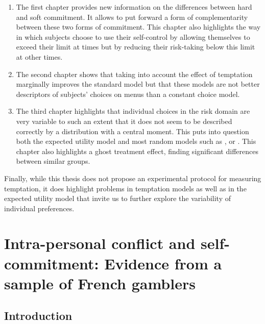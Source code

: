 \documentclass[
]{book}
\providecommand{\tightlist}{%
  \setlength{\itemsep}{0pt}\setlength{\parskip}{0pt}}
\begin{document}
\begin{enumerate}
\def\labelenumi{\arabic{enumi}.}
\tightlist
\item
  The first chapter provides new information on the differences between hard
  and soft commitment.
  It allows to put forward a form of complementarity between these two forms of
  commitment.
  This chapter also highlights the way in which subjects choose to use their
  self-control by allowing themselves to exceed their limit at times but by
  reducing their risk-taking below this limit at other times.
\item
  The second chapter shows that taking into account the effect of temptation
  marginally improves the standard model but that these models are not better
  descriptors of subjects' choices on menus than a constant choice model.
\item
  The third chapter highlights that individual choices in the risk domain are
  very variable to such an extent that it does not seem to be described correctly
  by a distribution with a central moment.
  This puts into question both the expected utility model and most random models
  such as \citet{gul2006random}, \citet{ratcliff2008diffusion} or \citet{cerreia2019deliberately}.
  This chapter also highlights a ghost treatment effect, finding significant
  differences between similar groups.
\end{enumerate}

Finally, while this thesis does not propose an experimental protocol for
measuring temptation, it does highlight problems in temptation models as well as
in the expected utility model that invite us to further explore the variability
of individual preferences.

\hypertarget{fdj}{%
\chapter{Intra-personal conflict and self-commitment: Evidence from a sample of French gamblers}\label{fdj}}

\hypertarget{intro2}{%
\section{Introduction}\label{intro2}}
\end{document}
